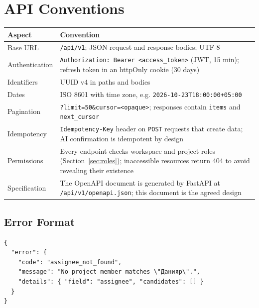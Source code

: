 \documentclass[11pt,a4paper]{article}
\newcommand{\tblstart}{\small\rowcolors{2}{gray!7}{white}}
\newcommand{\code}[1]{\texttt{#1}}
\begin{document}
\section{API Conventions}

{\tblstart
\begin{xltabular}{\textwidth}{P{3.4cm} L}
\toprule
\textbf{Aspect} & \textbf{Convention} \\
\midrule
\endhead
Base URL & \code{/api/v1}; JSON request and response bodies; UTF-8 \\
Authentication & \code{Authorization: Bearer <access\_token>} (JWT, 15 min); refresh token in an httpOnly cookie (30 days) \\
Identifiers & UUID v4 in paths and bodies \\
Dates & ISO 8601 with time zone, e.g. \code{2026-10-23T18:00:00+05:00} \\
Pagination & \code{?limit=50\&cursor=<opaque>}; responses contain \code{items} and \code{next\_cursor} \\
Idempotency & \code{Idempotency-Key} header on \code{POST} requests that create data; AI confirmation is idempotent by design \\
Permissions & Every endpoint checks workspace and project roles (Section~\ref{sec:roles}); inaccessible resources return 404 to avoid revealing their existence \\
Specification & The OpenAPI document is generated by FastAPI at \code{/api/v1/openapi.json}; this document is the agreed design \\
\bottomrule
\end{xltabular}}

\subsection{Error Format}

\begin{Verbatim}
{
  "error": {
    "code": "assignee_not_found",
    "message": "No project member matches \"Данияр\".",
    "details": { "field": "assignee", "candidates": [] }
  }
}
\end{Verbatim}
\end{document}
